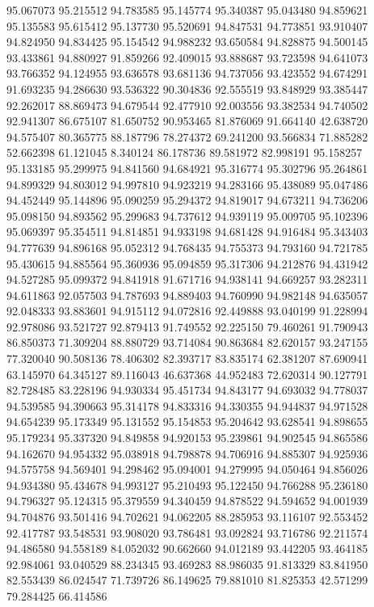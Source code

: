 95.067073
95.215512
94.783585
95.145774
95.340387
95.043480
94.859621
95.135583
95.615412
95.137730
95.520691
94.847531
94.773851
93.910407
94.824950
94.834425
95.154542
94.988232
93.650584
94.828875
94.500145
93.433861
94.880927
91.859266
92.409015
93.888687
93.723598
94.641073
93.766352
94.124955
93.636578
93.681136
94.737056
93.423552
94.674291
91.693235
94.286630
93.536322
90.304836
92.555519
93.848929
93.385447
92.262017
88.869473
94.679544
92.477910
92.003556
93.382534
94.740502
92.941307
86.675107
81.650752
90.953465
81.876069
91.664140
42.638720
94.575407
80.365775
88.187796
78.274372
69.241200
93.566834
71.885282
52.662398
61.121045
8.340124
86.178736
89.581972
82.998191
95.158257
95.133185
95.299975
94.841560
94.684921
95.316774
95.302796
95.264861
94.899329
94.803012
94.997810
94.923219
94.283166
95.438089
95.047486
94.452449
95.144896
95.090259
95.294372
94.819017
94.673211
94.736206
95.098150
94.893562
95.299683
94.737612
94.939119
95.009705
95.102396
95.069397
95.354511
94.814851
94.933198
94.681428
94.916484
95.343403
94.777639
94.896168
95.052312
94.768435
94.755373
94.793160
94.721785
95.430615
94.885564
95.360936
95.094859
95.317306
94.212876
94.431942
94.527285
95.099372
94.841918
91.671716
94.938141
94.669257
93.282311
94.611863
92.057503
94.787693
94.889403
94.760990
94.982148
94.635057
92.048333
93.883601
94.915112
94.072816
92.449888
93.040199
91.228994
92.978086
93.521727
92.879413
91.749552
92.225150
79.460261
91.790943
86.850373
71.309204
88.880729
93.714084
90.863684
82.620157
93.247155
77.320040
90.508136
78.406302
82.393717
83.835174
62.381207
87.690941
63.145970
64.345127
89.116043
46.637368
44.952483
72.620314
90.127791
82.728485
83.228196
94.930334
95.451734
94.843177
94.693032
94.778037
94.539585
94.390663
95.314178
94.833316
94.330355
94.944837
94.971528
94.654239
95.173349
95.131552
95.154853
95.204642
93.628541
94.898655
95.179234
95.337320
94.849858
94.920153
95.239861
94.902545
94.865586
94.162670
94.954332
95.038918
94.798878
94.706916
94.885307
94.925936
94.575758
94.569401
94.298462
95.094001
94.279995
94.050464
94.856026
94.934380
95.434678
94.993127
95.210493
95.122450
94.766288
95.236180
94.796327
95.124315
95.379559
94.340459
94.878522
94.594652
94.001939
94.704876
93.501416
94.702621
94.062205
88.285953
93.116107
92.553452
92.417787
93.548531
93.908020
93.786481
93.092824
93.716786
92.211574
94.486580
94.558189
84.052032
90.662660
94.012189
93.442205
93.464185
92.984061
93.040529
88.234345
93.469283
88.986035
91.813329
83.841950
82.553439
86.024547
71.739726
86.149625
79.881010
81.825353
42.571299
79.284425
66.414586
